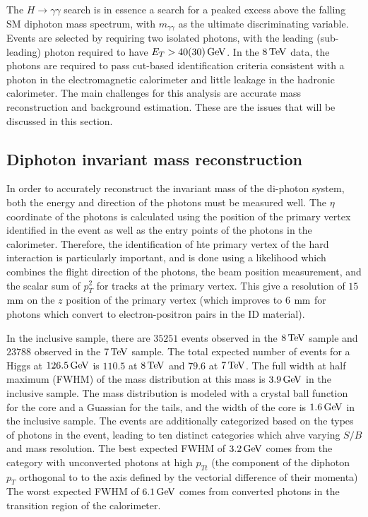 The $H\to\gamma\gamma$ search is in essence a search for a peaked excess above the falling SM diphoton mass spectrum, with $m_{\gamma\gamma}$ as the ultimate discriminating variable. Events are selected by requiring two isolated photons, with the leading (sub-leading) photon required to have $E_{T} > 40 (30) \GeV$. In the $8 \TeV$ data, the photons are required to pass cut-based identification criteria consistent with a photon in the electromagnetic calorimeter and little leakage in the hadronic calorimeter. The main challenges for this analysis are accurate mass reconstruction and background estimation. These are the issues that will be discussed in this section.

\subsection{Diphoton invariant mass reconstruction}

In order to accurately reconstruct the invariant mass of the di-photon system, both the energy and direction of the photons must be measured well. The $\eta$ coordinate of the photons is calculated using the position of the primary vertex identified in the event as well as the entry points of the photons in the calorimeter. Therefore, the identification of hte primary vertex of the hard interaction is particularly important, and is done using a likelihood which combines the flight direction of the photons, the beam position measurement, and the scalar sum of $p_{T}^2$ for tracks at the primary vertex. This give a resolution of $15$ $\rm mm$ on the $z$ position of the primary vertex (which improves to $6$ $\rm mm$ for photons which convert to electron-positron pairs in the ID material). 

In the inclusive sample, there are $35251$ events observed in the $8 \TeV$ sample and $23788$ observed in the $7 \TeV$ sample. The total expected number of events for a Higgs at $126.5 \GeV$ is $110.5$ at $8 \TeV$ and $79.6$ at $7 \TeV$. The full width at half maximum (FWHM) of the mass distribution at this mass is $3.9 \GeV$ in the inclusive sample. The mass distribution is modeled with a crystal ball function for the core and a Guassian for the tails, and the width of the core is $1.6 \GeV$ in the inclusive sample. The events are additionally categorized based on the types of photons in the event, leading to ten distinct categories which ahve varying $S/B$ and mass resolution. The best expected FWHM of $3.2 \GeV$ comes from the category with unconverted photons at high $p_{Tt}$ (the component of the diphoton $p_{T}$ orthogonal to to the axis defined by the vectorial difference of their momenta) The worst expected FWHM of $6.1 \GeV$ comes from converted photons in the transition region of the calorimeter. 

